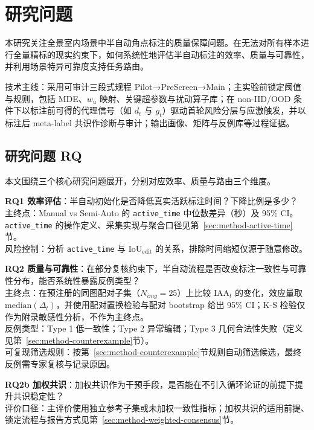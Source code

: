 ﻿\section{研究问题}

本研究关注全景室内场景中半自动角点标注的质量保障问题。在无法对所有样本进行全量精标的现实约束下，如何系统性地评估半自动标注的效率、质量与可靠性，并利用场景特异可靠度支持任务路由。

技术主线：采用可审计三段式规程 Pilot→PreScreen→Main；主实验前锁定阈值与规则，包括 MDE、$w_u$ 映射、关键超参数与扰动算子库；在 non-IID/OOD 条件下以标注前可得的代理信号（如 $d_t$ 与 $g_t$）驱动首轮风险分层与应激触发，并以标注后 meta-label 共识作诊断与审计；输出画像、矩阵与反例库等过程证据。
\subsection{研究问题 RQ}

本文围绕三个核心研究问题展开，分别对应效率、质量与路由三个维度。

\textbf{RQ1 效率评估}：半自动初始化是否降低真实活跃标注时间？下降比例是多少？
\\ 主终点：Manual vs Semi-Auto 的 \texttt{active\_time} 中位数差异（秒）及 95\% CI。 \texttt{active\_time} 的操作定义、采集实现与聚合口径见第~\ref{sec:method-active-time}节。
\\ 风险控制：分析 \texttt{active\_time} 与 $\mathrm{IoU}_{\mathrm{edit}}$ 的关系，排除时间缩短仅源于随意修改。

\textbf{RQ2 质量与可靠性}：在部分复核约束下，半自动流程是否改变标注一致性与可靠性分布，能否系统性暴露反例类型？
\\ 主终点：在预注册的同图配对子集（$N_{img}=25$）上比较 $\mathrm{IAA}_t$ 的变化，效应量取 $\mathrm{median}(\Delta_t)$，并使用配对置换检验与配对 bootstrap 给出 95\% CI；K-S 检验仅作为附录敏感性分析，不作为主终点。
\\ 反例类型：Type 1 低一致性；Type 2 异常编辑；Type 3 几何合法性失败（定义见第~\ref{sec:method-counterexample}节）。
\\ 可复现筛选规则：按第~\ref{sec:method-counterexample}节规则自动筛选候选，最终反例需专家复核与记录原因。

\textbf{RQ2b 加权共识}：加权共识作为干预手段，是否能在不引入循环论证的前提下提升共识稳定性？
\\ 评价口径：主评价使用独立参考子集或未加权一致性指标；加权共识的适用前提、锁定流程与报告方式见第~\ref{sec:method-weighted-consensus}节。

